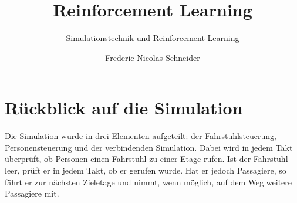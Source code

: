 \documentclass[envcountsame, envcountchap, deutsch]{i-studis}
\begin{document}
\title{Reinforcement Learning}
\subtitle{Simulationstechnik und Reinforcement Learning}

\author{Frederic Nicolas Schneider}


\address{Trier}


\mytitlepage

\frontmatter
\tableofcontents										%


\mainmatter
\newpage

\hypertarget{ruxfcckblick-auf-die-simulation}{%
\chapter{Rückblick auf die
Simulation}\label{ruxfcckblick-auf-die-simulation}}

Die Simulation wurde in drei Elementen aufgeteilt: der
Fahrstuhlsteuerung, Personensteuerung und der verbindenden Simulation.
Dabei wird in jedem Takt überprüft, ob Personen einen Fahrstuhl zu einer
Etage rufen. Ist der Fahrstuhl leer, prüft er in jedem Takt, ob er
gerufen wurde. Hat er jedoch Passagiere, so fährt er zur nächsten
Zieletage und nimmt, wenn möglich, auf dem Weg weitere Passagiere mit.




\end{document}
